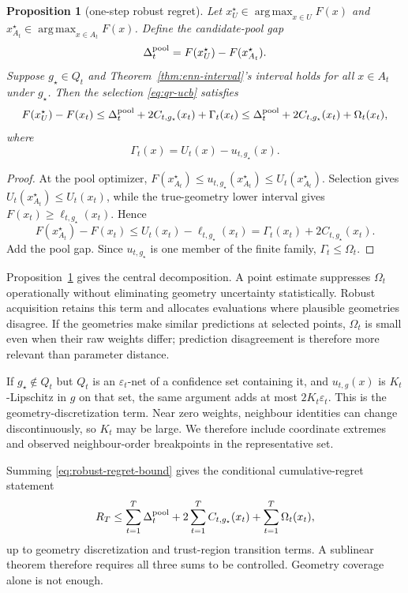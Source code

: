 \documentclass[11pt]{article}
\newtheorem{proposition}[theorem]{Proposition}
\theoremstyle{definition}
\theoremstyle{remark}
\newcommand{\1}{\mathbf 1}
\newcommand{\argmax}{\operatorname*{arg\,max}}
\begin{document}
\begin{proposition}[one-step robust regret]\label{prop:robust-regret}
Let $x_U^\star\in\argmax_{x\in U}F(x)$ and
$x_{A_t}^\star\in\argmax_{x\in A_t}F(x)$.  Define the candidate-pool gap
\[
  \Delta_t^{\rm pool}=F(x_U^\star)-F(x_{A_t}^\star).
\]
Suppose $g_\star\in Q_t$ and Theorem~\ref{thm:enn-interval}'s interval holds for all
$x\in A_t$ under $g_\star$.  Then the selection \eqref{eq:qr-ucb} satisfies
\begin{equation}\label{eq:robust-regret-bound}
  F(x_U^\star)-F(x_t)
  \le \Delta_t^{\rm pool}+2C_{t,g_\star}(x_t)+\Gamma_t(x_t)
  \le \Delta_t^{\rm pool}+2C_{t,g_\star}(x_t)+\Omega_t(x_t),
\end{equation}
where
\[
  \Gamma_t(x)=U_t(x)-u_{t,g_\star}(x).
\]
\end{proposition}
\begin{proof}
At the pool optimizer,
$F(x_{A_t}^\star)\le u_{t,g_\star}(x_{A_t}^\star)\le U_t(x_{A_t}^\star)$.
Selection gives $U_t(x_{A_t}^\star)\le U_t(x_t)$, while the true-geometry lower interval gives
$F(x_t)\ge\ell_{t,g_\star}(x_t)$.  Hence
\[
 F(x_{A_t}^\star)-F(x_t)
 \le U_t(x_t)-\ell_{t,g_\star}(x_t)
 =\Gamma_t(x_t)+2C_{t,g_\star}(x_t).
\]
Add the pool gap.  Since $u_{t,g_\star}$ is one member of the finite family,
$\Gamma_t\le\Omega_t$.
\end{proof}

Proposition~\ref{prop:robust-regret} gives the central decomposition.  A point estimate suppresses
$\Omega_t$ operationally without eliminating geometry uncertainty statistically.  Robust
acquisition retains this term and allocates evaluations where plausible geometries disagree.  If
the geometries make similar predictions at selected points, $\Omega_t$ is small even when their raw
weights differ; prediction disagreement is therefore more relevant than parameter distance.

If $g_\star\notin Q_t$ but $Q_t$ is an $\varepsilon_t$-net of a confidence set containing it, and
$u_{t,g}(x)$ is $K_t$-Lipschitz in $g$ on that set, the same argument adds at most
$2K_t\varepsilon_t$.  This is the geometry-discretization term.  Near zero weights, neighbour
identities can change discontinuously, so $K_t$ may be large.  We therefore include coordinate
extremes and observed neighbour-order breakpoints in the representative set.

Summing \eqref{eq:robust-regret-bound} gives the conditional cumulative-regret statement
\begin{equation}\label{eq:cumulative}
  R_T
  \le \sum_{t=1}^{T}\Delta_t^{\rm pool}
  +2\sum_{t=1}^{T}C_{t,g_\star}(x_t)
  +\sum_{t=1}^{T}\Omega_t(x_t),
\end{equation}
up to geometry discretization and trust-region transition terms.  A sublinear theorem therefore
requires all three sums to be controlled.  Geometry coverage alone is not enough.
\end{document}
